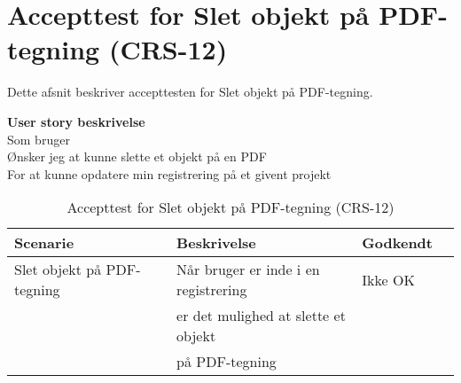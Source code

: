 \section{Accepttest for Slet objekt på PDF-tegning (CRS-12)}
Dette afsnit beskriver accepttesten for Slet objekt på PDF-tegning.

\textbf{User story beskrivelse} \\
Som bruger \\
Ønsker jeg at kunne slette et objekt på en PDF \\
For at kunne opdatere min registrering på et givent projekt

\begin{table}[H]
	\centering
	\begin{tabular}{|ll|l|ll|} \hline
		\textbf{Scenarie} &  & \textbf{Beskrivelse}&  \textbf{Godkendt}&  \\ \hline
		Slet objekt på PDF-tegning&  &  Når bruger er inde i en registrering &  Ikke OK&  \\
		& & er det mulighed at slette et objekt& & \\ 
		& & på PDF-tegning& & \\ \hline
	\end{tabular}
	\caption{Accepttest for Slet objekt på PDF-tegning (CRS-12)}
	\label{AcceptSlet}
\end{table}